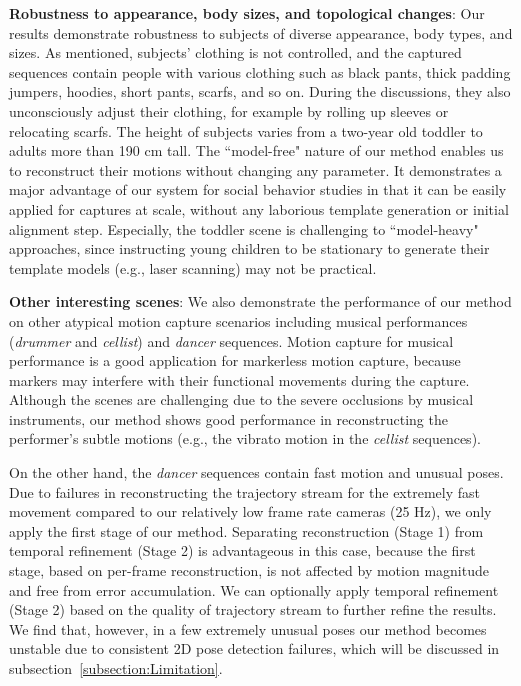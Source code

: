 \textbf{Robustness to appearance, body sizes, and topological changes}: 
Our results demonstrate robustness to subjects of diverse appearance, body types, and sizes. As mentioned, subjects' clothing is not controlled, and the captured sequences contain people with various clothing such as black pants, thick padding jumpers, hoodies, short pants, scarfs, and so on. During the discussions, they also unconsciously adjust their clothing, for example by rolling up sleeves or relocating scarfs. The height of subjects varies from a two-year old toddler to adults more than 190 cm tall. The ``model-free" nature of our method enables us to reconstruct their motions without changing any parameter. It demonstrates a major advantage of our system for social behavior studies in that it can be easily applied for captures at scale, without any laborious template generation or initial alignment step. Especially, the toddler scene is challenging to  ``model-heavy" approaches, since instructing young children to be stationary to generate their template models (e.g., laser scanning) may not be practical. 


\textbf{Other interesting scenes}:
We also demonstrate the performance of our method on other atypical motion capture scenarios including musical performances (\emph{drummer} and \emph{cellist}) and \emph{dancer} sequences. Motion capture for musical performance is a good application for markerless motion capture, because markers may interfere with their functional movements during the capture. Although the scenes are challenging due to the severe occlusions by musical instruments, our method shows good performance in reconstructing the performer's subtle motions (e.g., the vibrato motion in the \emph{cellist} sequences).

On the other hand, the \emph{dancer} sequences contain fast motion and unusual poses. Due to failures in reconstructing the trajectory stream for the extremely fast movement compared to our relatively low frame rate cameras (25 Hz), we only apply the first stage of our method. Separating reconstruction (Stage 1) from temporal refinement (Stage 2) is advantageous in this case, because the first stage, based on per-frame reconstruction, is not affected by motion magnitude and free from error accumulation. We can optionally apply temporal refinement (Stage 2) based on the quality of trajectory stream to further refine the results. We find that, however, in a few extremely unusual poses our method becomes unstable due to consistent 2D pose detection failures, which will be discussed in subsection~\ref{subsection:Limitation}. 


